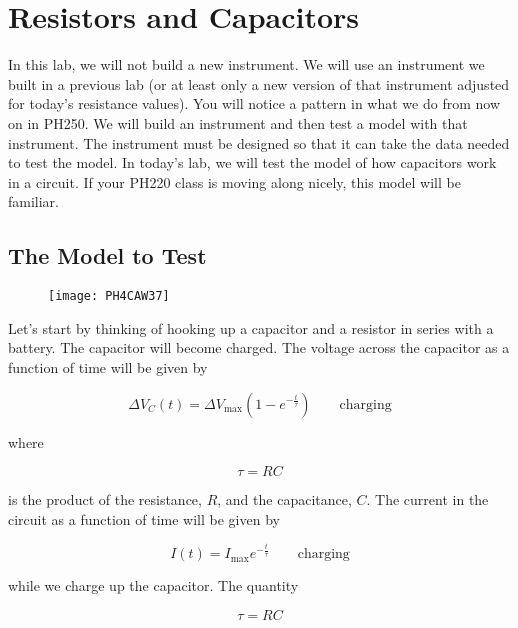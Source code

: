 \chapter{Resistors and Capacitors}
In this lab, we will not build a new instrument. We will use an instrument we built in a previous lab (or at least only a new version of that instrument adjusted for today's resistance values). You will notice a pattern in what we do from now on in PH250. We will build an instrument and then test a model with that instrument. The instrument must be designed so that it can take the data needed to test the model. In today's lab, we will test the model of how capacitors work in a circuit. If your PH220 class is
moving along nicely, this model will be familiar.

\section{The Model to Test}

\begin{figure}[h!]
\texttt{[image: PH4CAW37]}
\end{figure}

Let's start by thinking of hooking up a capacitor and a resistor in series with a battery. The capacitor will become charged. The voltage across the capacitor as a function of time will be given by

\begin{equation*}
	\Delta V_{C}\left( t\right) =\Delta V_{\max }\left( 1-e^{-\frac{t}{\tau } }\right) \qquad \text{charging}
\end{equation*}

\noindent where 

\begin{equation}
	\tau =RC
\end{equation}

\noindent is the product of the resistance, $R$, and the capacitance, $C.$ The current in the circuit as a function of time will be given by 

\begin{equation*}
	I\left( t\right) =I_{\max }e^{-\frac{t}{\tau }}\qquad \text{charging}
\end{equation*}

\noindent while we charge up the capacitor. The quantity 

\begin{equation*}
	\tau =RC
\end{equation*}

